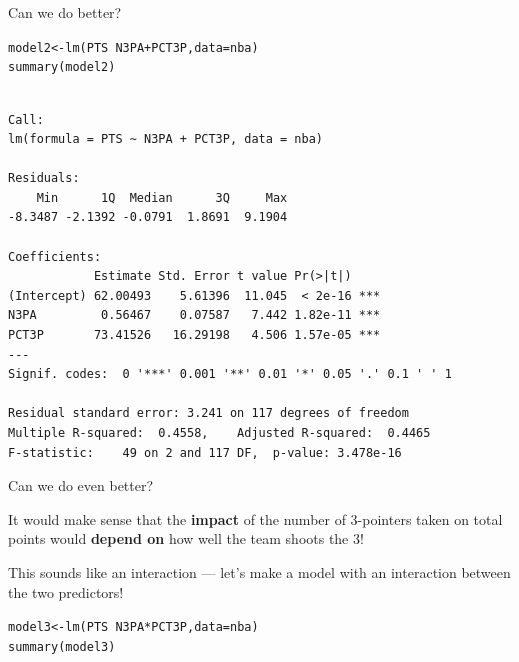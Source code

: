 \documentclass{beamer}\usepackage[]{graphicx}\usepackage[]{color}
\makeatletter
\newcommand{\hlopt}[1]{\textcolor[rgb]{1,0.894,0.769}{#1}}%
\newcommand{\hlstd}[1]{\textcolor[rgb]{1,0.894,0.769}{#1}}%
\newcommand{\hlkwb}[1]{\textcolor[rgb]{0.804,0.776,0.451}{#1}}%
\newcommand{\hlkwc}[1]{\textcolor[rgb]{0.78,0.941,0.545}{#1}}%
\newcommand{\hlkwd}[1]{\textcolor[rgb]{1,0.78,0.769}{#1}}%
\newenvironment{kframe}{%
 \def\at@end@of@kframe{}%
 \ifinner\ifhmode%
  \def\at@end@of@kframe{\end{minipage}}%
  \begin{minipage}{\columnwidth}%
 \fi\fi%
 \def\FrameCommand##1{\hskip\@totalleftmargin \hskip-\fboxsep
 \colorbox{shadecolor}{##1}\hskip-\fboxsep
     \hskip-\linewidth \hskip-\@totalleftmargin \hskip\columnwidth}%
 \MakeFramed {\advance\hsize-\width
   \@totalleftmargin\z@ \linewidth\hsize
   \@setminipage}}%
 {\par\unskip\endMakeFramed%
 \at@end@of@kframe}
\newenvironment{knitrout}{}{} %
\makeatother
\begin{document}
\begin{darkframes}
    \begin{frame}[fragile]{Can we do better?}
      \fontsize{8}{8}\selectfont
\begin{knitrout}
\begin{kframe}
\begin{alltt}
\hlstd{model2} \hlkwb{<-} \hlkwd{lm}\hlstd{(PTS} \hlopt{~} \hlstd{N3PA} \hlopt{+} \hlstd{PCT3P,} \hlkwc{data}\hlstd{=nba)}
\hlkwd{summary}\hlstd{(model2)}
\end{alltt}
\begin{verbatim}

Call:
lm(formula = PTS ~ N3PA + PCT3P, data = nba)

Residuals:
    Min      1Q  Median      3Q     Max 
-8.3487 -2.1392 -0.0791  1.8691  9.1904 

Coefficients:
            Estimate Std. Error t value Pr(>|t|)    
(Intercept) 62.00493    5.61396  11.045  < 2e-16 ***
N3PA         0.56467    0.07587   7.442 1.82e-11 ***
PCT3P       73.41526   16.29198   4.506 1.57e-05 ***
---
Signif. codes:  0 '***' 0.001 '**' 0.01 '*' 0.05 '.' 0.1 ' ' 1

Residual standard error: 3.241 on 117 degrees of freedom
Multiple R-squared:  0.4558,	Adjusted R-squared:  0.4465 
F-statistic:    49 on 2 and 117 DF,  p-value: 3.478e-16
\end{verbatim}
\end{kframe}
\end{knitrout}
    \end{frame}

    \begin{frame}{Can we do even better?}
      \begin{center}
        It would make sense that the \textbf{impact} of the number of 3-pointers taken on total points would \textbf{depend on} how well the team shoots the 3!

        \pause\bigskip

        This sounds like an interaction --- let's make a model with an interaction between the two predictors!
      \end{center}
    \end{frame}
    
    \begin{frame}[fragile]
      \fontsize{8}{8}\selectfont
\begin{knitrout}
\begin{kframe}
\begin{alltt}
\hlstd{model3} \hlkwb{<-} \hlkwd{lm}\hlstd{(PTS} \hlopt{~} \hlstd{N3PA} \hlopt{*} \hlstd{PCT3P,} \hlkwc{data}\hlstd{=nba)}
\hlkwd{summary}\hlstd{(model3)}
\end{alltt}
\begin{verbatim}


\end{verbatim}
\end{kframe}
\end{knitrout}
\end{frame}
\end{darkframes}
\end{document}

